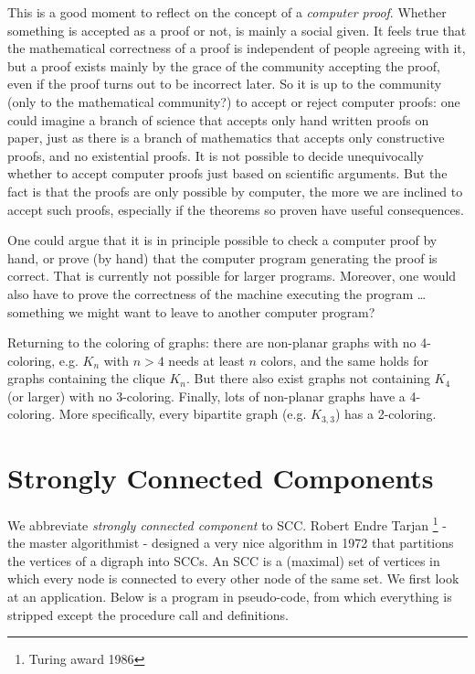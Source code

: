 This is a good moment to reflect on the concept of a {\em computer
  proof}. Whether something is accepted as a proof or not, is mainly a
social given. It feels true that the mathematical correctness of a
proof is independent of people agreeing with it, but a proof exists
mainly by the grace of the community accepting the proof, even if the
proof turns out to be incorrect later. So it is up to the community
(only to the mathematical community?) to accept or reject computer
proofs: one could imagine a branch of science that accepts only hand
written proofs on paper, just as there is a branch of mathematics that
accepts only constructive proofs, and no existential proofs. It is not
possible to decide unequivocally whether to accept computer proofs just
based on scientific arguments. But the fact is that the proofs are
only possible by computer, the more we are inclined to accept such
proofs, especially if the theorems so proven have useful consequences.

One could argue that it is in principle possible to check a computer
proof by hand, or prove (by hand) that the computer program generating
the proof is correct. That is currently not possible for larger
programs. Moreover, one would also have to prove the correctness of
the machine executing the program \ldots something we might want to
leave to another computer program?

Returning to the coloring of graphs: there are non-planar graphs with
no 4-coloring, e.g. $K_{n}$ with $n > 4$ needs at least $n$ colors,
and the same holds for graphs containing the clique $K_n$. But there also
exist graphs not containing $K_4$ (or larger) with no
3-coloring. Finally, lots of non-planar graphs have a 4-coloring. More
specifically, every bipartite graph (e.g. $K_{3,3}$) has a 2-coloring.


\section{Strongly Connected Components}\label{sccs}

We abbreviate {\em strongly connected component} to SCC. Robert Endre
Tarjan \footnote{Turing award 1986} - the master algorithmist -
designed a very nice algorithm in 1972 that partitions the vertices of
a digraph into SCCs. An SCC is a (maximal) set of vertices in which
every node is connected to every other node of the same set. We first
look at an application. Below is a program in pseudo-code, from which
everything is stripped except the procedure call and definitions.

